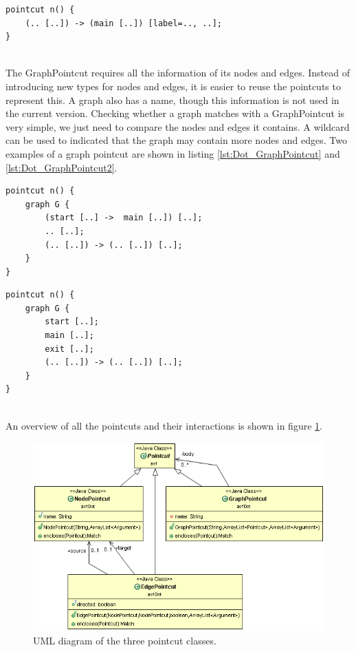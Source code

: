 \documentclass[a4paper]{report}
\begin{document}
\begin{minipage}{0.45\textwidth}
\begin{lstlisting}[caption=An edge pointcut matching any edge to main with a specified label., label=lst:Dot_EdgePointcut2]
pointcut n() {
	(.. [..]) -> (main [..]) [label=.., ..];
}
\end{lstlisting}
\end{minipage}
\\
The GraphPointcut requires all the information of its nodes and edges. Instead of introducing new types for nodes and edges, it is easier to reuse the pointcuts to represent this. A graph also has a name, though this information is not used in the current version. Checking whether a graph matches with a GraphPointcut is very simple, we just need to compare the nodes and edges it contains. A wildcard can be used to indicated that the graph may contain more nodes and edges. Two examples of a graph pointcut are shown in listing \ref{lst:Dot_GraphPointcut} and \ref{lst:Dot_GraphPointcut2}.\\
\begin{minipage}{0.45\textwidth}
\begin{lstlisting}[caption=A graph pointcut matching any graph G with an edge from start to main, label=lst:Dot_GraphPointcut]
pointcut n() {
	graph G {
		(start [..] ->  main [..]) [..];
		.. [..];
		(.. [..]) -> (.. [..]) [..];
	}
}
\end{lstlisting}
\end{minipage}
\begin{minipage}{0.45\textwidth}
\begin{lstlisting}[caption=A graph pointcut matching any graph G with only three nodes., label=lst:Dot_GraphPointcut2]
pointcut n() {
	graph G {
		start [..];
		main [..];
		exit [..];
		(.. [..]) -> (.. [..]) [..];
	}
}
\end{lstlisting}
\end{minipage}
\\
An overview of all the pointcuts and their interactions is shown in figure \ref{fig:DotPointcuts}.
\begin{figure}[h!]
\centering
\includegraphics[scale=0.6]{images/AOFDot/DotPointcuts.png}
\caption{UML diagram of the three pointcut classes.}
\label{fig:DotPointcuts}
\end{figure}
\end{document}
